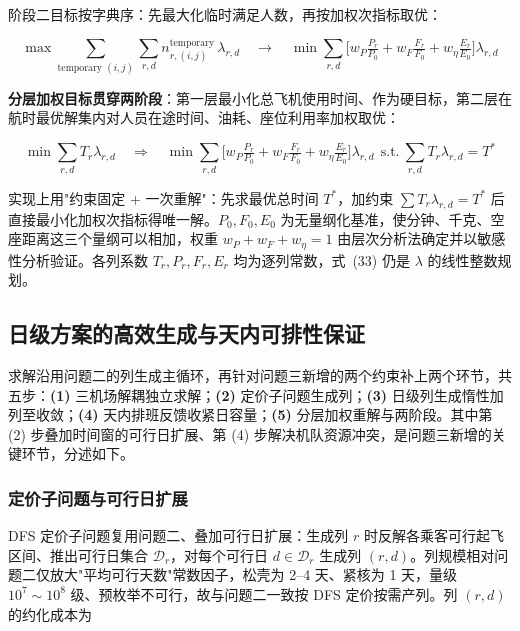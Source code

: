 \documentclass[zihao=-4,a4paper]{ctexart}
\begin{document}
阶段二目标按字典序：先最大化临时满足人数，再按加权次指标取优：

\begin{equation}
  \max \sum_{\text{temporary }(i,j)}\sum_{r,d} n_{r,(i,j)}^{\text{temporary}}\,\lambda_{r,d}
  \quad\to\quad \min \sum_{r,d}\Big[w_P\tfrac{P_r}{P_0}+w_F\tfrac{F_r}{F_0}+w_\eta\tfrac{E_r}{E_0}\Big]\lambda_{r,d}
\end{equation}

\textbf{分层加权目标贯穿两阶段}：第一层最小化总飞机使用时间、作为硬目标，第二层在航时最优解集内对人员在途时间、油耗、座位利用率加权取优：

\begin{equation}
  \min \sum_{r,d} T_r\lambda_{r,d}
  \quad\Longrightarrow\quad \min \sum_{r,d}\Big[w_P\tfrac{P_r}{P_0}+w_F\tfrac{F_r}{F_0}+w_\eta\tfrac{E_r}{E_0}\Big]\lambda_{r,d}\ \ \text{s.t.}\ \sum_{r,d}T_r\lambda_{r,d}=T^*
\end{equation}

实现上用"约束固定 + 一次重解"：先求最优总时间 $T^*$，加约束 $\sum T_r\lambda_{r,d}=T^*$ 后直接最小化加权次指标得唯一解。$P_0,F_0,E_0$ 为无量纲化基准，使分钟、千克、空座距离这三个量纲可以相加，权重 $w_P+w_F+w_\eta=1$ 由层次分析法确定并以敏感性分析验证。各列系数 $T_r,P_r,F_r,E_r$ 均为逐列常数，式~(33) 仍是 $\lambda$ 的线性整数规划。

\subsection{日级方案的高效生成与天内可排性保证}

求解沿用问题二的列生成主循环，再针对问题三新增的两个约束补上两个环节，共五步：\textbf{(1)} 三机场解耦独立求解；\textbf{(2)} 定价子问题生成列；\textbf{(3)} 日级列生成惰性加列至收敛；\textbf{(4)} 天内排班反馈收紧日容量；\textbf{(5)} 分层加权重解与两阶段。其中第 (2) 步叠加时间窗的可行日扩展、第 (4) 步解决机队资源冲突，是问题三新增的关键环节，分述如下。

\subsubsection{定价子问题与可行日扩展}

DFS 定价子问题复用问题二、叠加可行日扩展：生成列 $r$ 时反解各乘客可行起飞区间、推出可行日集合 $\mathcal{D}_r$，对每个可行日 $d\in\mathcal{D}_r$ 生成列 $(r,d)$。列规模相对问题二仅放大"平均可行天数"常数因子，松壳为 2--4 天、紧核为 1 天，量级 $10^7\sim10^8$ 级、预枚举不可行，故与问题二一致按 DFS 定价按需产列。列 $(r,d)$ 的约化成本为
\end{document}
